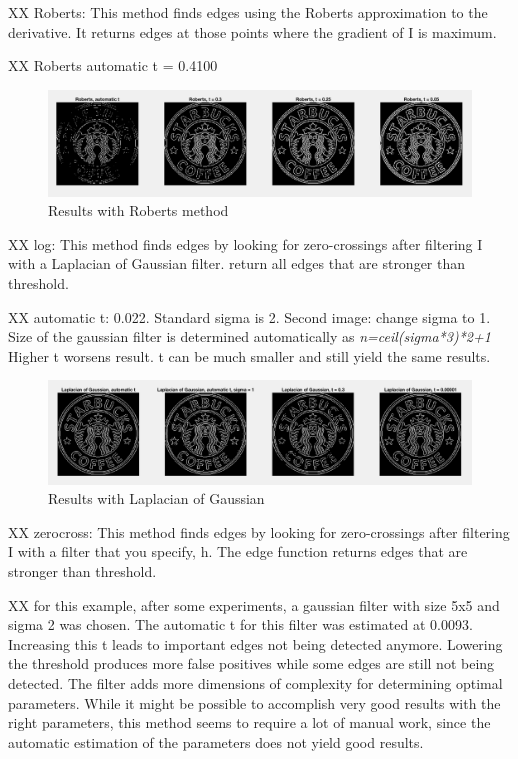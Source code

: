\documentclass[11pt]{article}
\begin{document}
XX Roberts: This method finds edges using the Roberts approximation to the derivative. It returns edges at those points where the gradient of I is maximum.

XX Roberts automatic t = 0.4100

\begin{figure}[!hbt]
  \includegraphics[width=\textwidth]{im3}
  \caption{Results with Roberts method}
  \label{fig:im3}
\end{figure}

XX log: This method finds edges by looking for zero-crossings after filtering I with a Laplacian of Gaussian filter. return all edges that are stronger than threshold.

XX automatic t: 0.022. Standard sigma is 2. Second image: change sigma to 1. Size of the gaussian filter is determined automatically as \textit{n=ceil(sigma*3)*2+1} Higher t worsens result. t can be much smaller and still yield the same results.

\begin{figure}[!hbt]
  \includegraphics[width=\textwidth]{im4}
  \caption{Results with Laplacian of Gaussian}
  \label{fig:im4}
\end{figure}

XX zerocross: This method finds edges by looking for zero-crossings after filtering I with a filter that you specify, h. The edge function returns edges that are stronger than threshold.

XX for this example, after some experiments, a gaussian filter with size 5x5 and sigma 2 was chosen. The automatic t for this filter was estimated at 0.0093. Increasing this t leads to important edges not being detected anymore. Lowering the threshold produces more false positives while some edges are still not being detected. The filter adds more dimensions of complexity for determining optimal parameters. While it might be possible to accomplish very good results with the right parameters, this method seems to require a lot of manual work, since the automatic estimation of the parameters does not yield good results.
\end{document}
